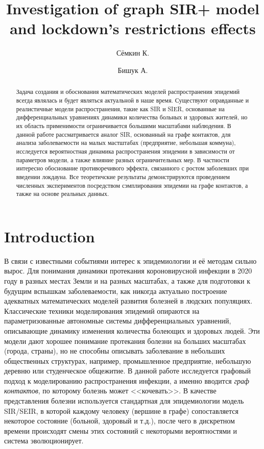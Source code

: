 
\usepackage[backend=biber]{biblatex}



\title{Investigation of graph SIR+ model and lockdown's restrictions effects}
\author{Сёмкин К. \and Бишук А.}
\date{}


	
	\maketitle
	
	\begin{abstract}
		Задача создания и обоснования математических моделей распространения эпидемий всегда являлась и будет являться актуальной в наше время. Существуют оправданные и реалистичные модели распространения, такие как SIR и SIER, основанные на дифференциальных уравнениях динамики количества больных и здоровых жителей, но их область применимости ограничивается большими масштабами наблюдения. В данной работе рассматривается аналог SIR, основанный на графе контактов, для анализа заболеваемости на малых мастштабах (предприятие, небольшая коммуна), исследуется вероятностная динамика распространения эпидемии в зависимости от параметров модели, а также влияние разных ограничительных мер. В частности интересно обоснование противоречивого эффекта, связанного с ростом заболевших при введении локдауна. Все теоретичские результаты демонстрируются проведением численных экспериментов посредством сэмплирования эпидемии на графе контактов, а также на основе реальных данных.
	\end{abstract}
	
	\section*{Introduction}
	
	В связи с известными событиями интерес к эпидемиологии и её методам сильно вырос. Для понимания динамики протекания короновирусной инфекции в 2020 году в разных местах Земли и на разных масштабах, а также для подготовки к будущим вспышкам заболеваемости, как никогда актуально построение адекватных математических моделей развития болезней в людских популяциях. Классические техники моделирования эпидемий опираются на параметризованные автономные системы дифференциальных уравнений, описывающие динамику изменения количества болеющих и здоровых людей. Эти модели дают хорошее понимание протекания болезни на больших масштабах (города, страны), но не способны описывать заболевание в небольших общественных структурах, например, промышленное предприятие, небольшую деревню или студенческое общежитие. В данной работе исследуется графовый подход к моделированию распространения инфекции, а именно вводится \textit{граф контактов}, по которому болезнь может <<кочевать>>. В качестве представления болезни используется стандартная для эпидемиологии модель SIR/SEIR, в которой каждому человеку (вершине в графе) сопоставляется некоторое состояние (больной, здоровый и т.д.), после чего в дискретном времени происходят смены этих состояний с некоторыми вероятностями и система эволюционирует.
	

